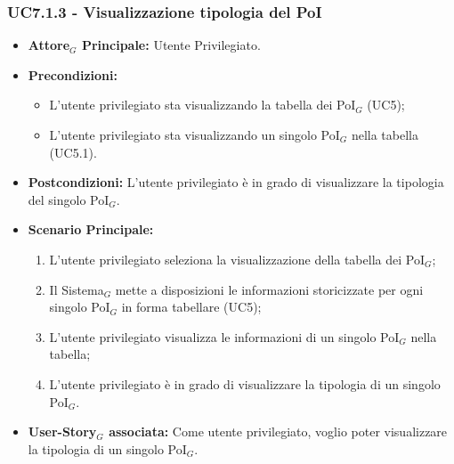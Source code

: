 \documentclass[10pt]{article}
\begin{document}
\begin{justify}
\subsubsection{\textbf{UC7.1.3 - Visualizzazione tipologia del PoI}}
\label{UC7.1.3}
\begin{itemize}
    \item \textbf{Attore$_G$ Principale:} Utente Privilegiato.
    \item \textbf{Precondizioni:} 
        \begin{itemize}
          \item L'utente privilegiato sta visualizzando la tabella dei PoI$_G$ (UC5);
            \item L'utente privilegiato sta visualizzando un singolo PoI$_G$ nella tabella (UC5.1).
        \end{itemize}
      \item \textbf{Postcondizioni:} L'utente privilegiato è in grado di visualizzare la tipologia del singolo PoI$_G$.
    \item \textbf{Scenario Principale:} 
        \begin{enumerate}
        \item L'utente privilegiato seleziona la visualizzazione della tabella dei PoI$_G$;
          \item Il Sistema$_G$ mette a disposizioni le informazioni storicizzate per ogni singolo PoI$_G$ in forma tabellare (UC5);
          \item L'utente privilegiato visualizza le informazioni di un singolo PoI$_G$ nella tabella;
            \item L'utente privilegiato è in grado di visualizzare la tipologia di un singolo PoI$_G$.
        \end{enumerate}
    \item \textbf{User-Story$_G$ associata:} Come utente privilegiato, voglio poter visualizzare la tipologia di un singolo PoI$_G$.
\end{itemize}

\end{justify}
\end{document}
